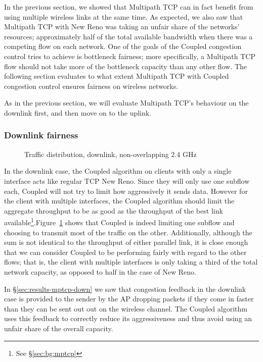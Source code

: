In the previous section, we showed that Multipath TCP can in fact benefit from
using multiple wireless links at the same time. As expected, we also saw that
Multipath TCP with New Reno was taking an unfair share of the networks'
resources; approximately half of the total available bandwidth when there was a
competing flow on each network. One of the goals of the Coupled congestion 
control tries to achieve is bottleneck fairness; more specifically, a 
Multipath TCP flow should not take more of the bottleneck capacity than any 
other flow. The following section evaluates to what extent Multipath TCP with 
Coupled congestion control ensures fairness on wireless networks.

As in the previous section, we will evaluate Multipath TCP's behaviour on the
downlink first, and then move on to the uplink.

\subsubsection{Downlink fairness}

\begin{figure}[h]
 \centering
 
 \caption{Traffic distribution, downlink, non-overlapping 2.4 GHz}\label{graph:down-fair}
\end{figure}

In the downlink case, the Coupled algorithm on clients with only a single
interface acts like regular TCP New Reno. Since they will only use one subflow
each, Coupled will not try to limit how aggressively it sends data. However for
the client with multiple interfaces, the Coupled algorithm should limit the
aggregate throughput to be as good as the throughput of the best link
available\footnote{See \S\ref{sec:bg:mptcp}}.\@ Figure~\ref{graph:down-fair}
shows that Coupled is indeed limiting one subflow and choosing to transmit most
of the traffic on the other.  Additionally, although the sum is not identical to
the throughput of either parallel link, it is close enough that we can consider
Coupled to be performing fairly with regard to the other flows; that is, the
client with multiple interfaces is only taking a third of the total network
capacity, as opposed to half in the case of New Reno.


In \S\ref{sec:results-mptcp-down} we saw that congestion feedback in the 
downlink case is provided to the sender by the AP dropping packets if they
come in faster than they can be sent out out on the wireless channel. The
Coupled algorithm uses this feedback to correctly reduce its aggressiveness and 
thus avoid using an unfair share of the overall capacity.

